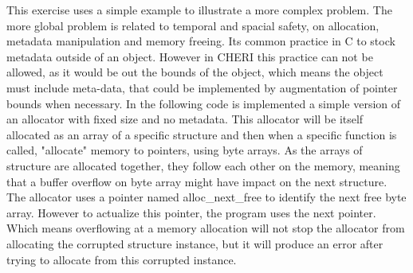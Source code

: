 \documentclass[a4paper, 11pt]{article}
\begin{document}
		This exercise uses a simple example to illustrate a more complex problem.
		The more global problem is related to temporal and spacial safety, on allocation, metadata manipulation and memory freeing. Its common practice in C to stock metadata outside of an object.
		However in CHERI this practice can not be allowed, as it would be out the bounds of the object, which means the object must include meta-data, that could be implemented by augmentation of pointer bounds when necessary.
		In the following code is implemented a simple version of an allocator with fixed size and no metadata. 
		This allocator will be itself allocated as an array of a specific structure and then when a specific function is called, "allocate" memory to pointers, using byte arrays.
		As the arrays of structure are allocated together, they follow each other on the memory, meaning that a buffer overflow on byte array might have impact on the next structure.
		The allocator uses a pointer named alloc\_next\_free to identify the next free byte array. However to actualize this pointer, the program uses the next pointer. Which means overflowing at a memory allocation will not stop the allocator from allocating the corrupted structure instance, but it will produce an error after trying to allocate from this corrupted instance.
\end{document}
